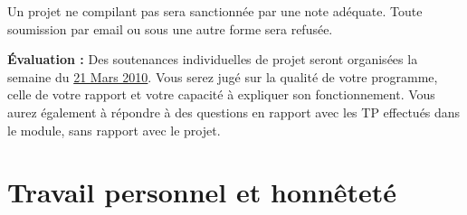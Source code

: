 \documentclass[10pt]{article}
\begin{document}
Un projet ne compilant pas sera sanctionnée par une note adéquate. Toute
soumission par email ou sous une autre forme sera refusée.

{\bf Évaluation :}  Des soutenances individuelles de projet seront organisées la
semaine du \underline{21 Mars 2010}. Vous serez jugé sur la qualité de votre
programme, celle de votre rapport et votre capacité à expliquer son
fonctionnement. Vous aurez également à répondre à des questions en rapport avec
les TP effectués dans le module, sans rapport  avec le projet.


\section*{Travail personnel et honnêteté}
\end{document}
